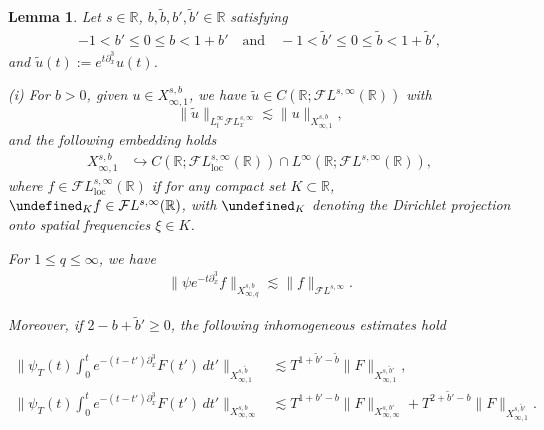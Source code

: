 \documentclass[%
11pt,  reqno]{amsart}
\newcommand{\5}{\textup{V}}
\newcommand{\noi}{\noindent}
\newcommand{\FL}{\mathcal{F} L}
\newcommand{\les}{\lesssim}
\newcommand{\wt}{\widetilde}
\newcommand{\embeds}{\hookrightarrow}
\newcommand{\dx}{\partial_x}
\newtheorem{lemma}[theorem]{Lemma}
\theoremstyle{remark}
\newcommand{\R}{\mathbb{R}}
\let\P= \undefined
\newcommand{\P}{\mathbf{P}}
\numberwithin{equation}{section}
\numberwithin{theorem}{section}
\begin{document}
		\begin{lemma}\label{lem:linear_estimates}
			Let $s\in\R$, $b,\wt b, b', \wt b'\in\R$ satisfying
            \begin{align}
                \label{bs}
                -1 < b' \le 0 \le b < 1 + b'
                \quad 
                \text{and} 
                \quad 
                -1 < \wt b' \le 0 \le \wt b < 1 + \wt b', 
            \end{align}
        and $\wt u(t) := e^{t\dx^3 } u(t)$. 
        
            \noi 
			{\rm(i)} For $b>0$,  given $u\in X^{s,b}_{\infty,1}$, we have $\wt{u}\in C(\R;\FL^{s,\infty}(\R))$ with
			\begin{equation}\label{lin}
				\|\wt{u}\|_{L^\infty_t\FL^{s, \infty}_x}\lesssim \|u\|_{X^{s,b}_{\infty,1}}, 
			\end{equation}
			and the following embedding holds
			\noi
			\begin{align}
				X^{s,b}_{\infty, 1} &
                \embeds C(\R; \FL_{\mathrm{loc}}^{s,\infty}(\R))\cap L^\infty(\R; \FL^{s,\infty}(\R)), 
			\end{align}
            where $f \in \FL^{s, \infty}_{\mathrm{loc}}(\R)$ if for any compact set $K\subset \R$, $\P_K f \in \FL^{s, \infty}(\R)$, with $\P_K$  denoting the Dirichlet projection onto spatial frequencies $ \xi \in K$.


			
			\smallskip
			
			\noi {\rm(ii)} 
            For $ 1 \le q \le \infty$, we have 
			\begin{align}
				\label{lin1}
				\| \psi e^{-t\dx^3} f \|_{X^{s,b}_{\infty,q}} \les \| f \|_{\FL^{s,\infty}}.
			\end{align}
			
			
			\noi{\rm(iii)} Moreover, if $2 - b + \wt b' \ge0$, the following inhomogeneous estimates hold
            
			\noi
			\begin{align}
				\label{lin2a}
				\bigg\| \psi_T (t) \int_0^t e^{-(t-t')\dx^3 } F(t') \, dt' \bigg\|_{X^{s,\wt{b}}_{\infty,1} } & \les T^{1+\wt{b}'-\wt{b}} \| F \|_{X^{s,\wt{b}'}_{\infty,1}}
                ,
            \\
				\label{lin2b}
				\bigg\| \psi_T (t) \int_0^t e^{-(t-t')\dx^3} F(t') \, dt' \bigg\|_{X^{s,b}_{\infty, \infty} } 
                &
                \les T^{1+b'-b} \| F\|_{X^{s, b'}_{\infty, \infty}} + T^{2+\wt{b}' -b} \|F\|_{X^{s, \wt{b}'}_{\infty, 1}}.
			\end{align}
			
			
			
		\end{lemma}
		
\end{document}
